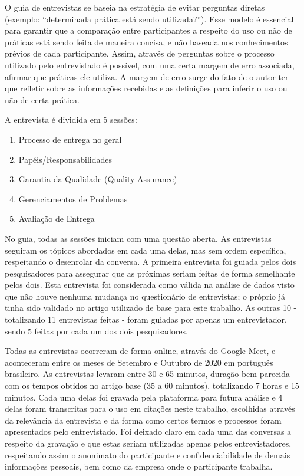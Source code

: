 O guia de entrevistas se baseia na estratégia de evitar perguntas diretas (exemplo: “determinada prática está sendo utilizada?”). Esse modelo é essencial para garantir que a comparação entre participantes a respeito do uso ou não de práticas está sendo feita de maneira concisa, e não baseada nos conhecimentos prévios de cada participante. Assim, através de perguntas sobre o processo utilizado pelo entrevistado é possível, com uma certa margem de erro associada, afirmar que práticas ele utiliza. A margem de erro surge do fato de o autor ter que refletir sobre as informações recebidas e as definições para inferir o uso ou não de certa prática.

A entrevista é dividida em 5 sessões: 

\begin{enumerate}
\item Processo de entrega no geral
\item Papéis/Responsabilidades
\item Garantia da Qualidade (Quality Assurance)
\item Gerenciamentos de Problemas
\item Avaliação de Entrega
\end{enumerate}

No guia, todas as sessões iniciam com uma questão aberta. As entrevistas seguiram os tópicos abordados em cada uma delas, mas sem ordem específica, respeitando o desenrolar da conversa. A primeira entrevista foi guiada pelos dois pesquisadores para assegurar que as próximas seriam feitas de forma semelhante pelos dois. Esta entrevista foi considerada como válida na análise de dados visto que não houve nenhuma mudança no questionário de entrevistas; o próprio já tinha sido validado no artigo utilizado de base para este trabalho. As outras 10 - totalizando 11 entrevistas feitas - foram guiadas por apenas um entrevistador, sendo 5 feitas por cada um dos dois pesquisadores.

Todas as entrevistas ocorreram de forma online, através do Google Meet, e aconteceram entre os meses de Setembro e Outubro de 2020 em português brasileiro. As entrevistas levaram entre 30 e 65 minutos, duração bem parecida com os tempos obtidos no artigo base (35 a 60 minutos), totalizando 7 horas e 15 minutos. Cada uma delas foi gravada pela plataforma para futura análise e 4 delas foram transcritas para o uso em citações neste trabalho, escolhidas através da relevância da entrevista e da forma como certos termos e processos foram apresentados pelo entrevistado. Foi deixado claro em cada uma das conversas a respeito da gravação e que estas seriam utilizadas apenas pelos entrevistadores, respeitando assim o anonimato do participante e confidenciabilidade de demais informações pessoais, bem como da empresa onde o participante trabalha.

